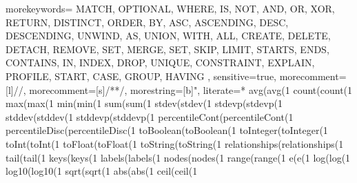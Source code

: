 \usepackage{listings}



{
	morekeywords={
		MATCH, OPTIONAL, WHERE, IS, NOT, AND, OR, XOR, RETURN, DISTINCT, ORDER, BY, ASC, ASCENDING, DESC, DESCENDING, UNWIND, AS, UNION, WITH, ALL, CREATE, DELETE, DETACH, REMOVE, SET, MERGE, SET, SKIP, LIMIT,
		STARTS, ENDS, CONTAINS,
		IN,
		INDEX, DROP, UNIQUE, CONSTRAINT, EXPLAIN, PROFILE, START, CASE,
		GROUP, HAVING
	},
	sensitive=true,
	morecomment=[l]{//},
	morecomment=[s]{/*}{*/},
	morestring=[b]{"},
	literate=*
		{avg(}{\textcolor{functioncolor}{avg}(}{1}%
		{count(}{\textcolor{functioncolor}{count}(}{1}%
		{max(}{\textcolor{functioncolor}{max}(}{1}%
		{min(}{\textcolor{functioncolor}{min}(}{1}%
		{sum(}{\textcolor{functioncolor}{sum}(}{1}%
		{stdev(}{\textcolor{functioncolor}{stdev}(}{1}%
		{stdevp(}{\textcolor{functioncolor}{stdevp}(}{1}%
		{stddev(}{\textcolor{functioncolor}{stddev}(}{1}%
		{stddevp(}{\textcolor{functioncolor}{stddevp}(}{1}%
		{percentileCont(}{\textcolor{functioncolor}{percentileCont}(}{1}%
		{percentileDisc(}{\textcolor{functioncolor}{percentileDisc}(}{1}%
		{toBoolean(}{\textcolor{functioncolor}{toBoolean}(}{1}%
		{toInteger(}{\textcolor{functioncolor}{toInteger}(}{1}%
		{toInt(}{\textcolor{functioncolor}{toInt}(}{1}%
		{toFloat(}{\textcolor{functioncolor}{toFloat}(}{1}%
		{toString(}{\textcolor{functioncolor}{toString}(}{1}%
		{relationships(}{\textcolor{functioncolor}{relationships}(}{1}%
		{tail(}{\textcolor{functioncolor}{tail}(}{1}%
		{keys(}{\textcolor{functioncolor}{keys}(}{1}%
		{labels(}{\textcolor{functioncolor}{labels}(}{1}%
		{nodes(}{\textcolor{functioncolor}{nodes}(}{1}%
		{range(}{\textcolor{functioncolor}{range}(}{1}%
		{e(}{\textcolor{functioncolor}{e}(}{1}%
		{log(}{\textcolor{functioncolor}{log}(}{1}%
		{log10(}{\textcolor{functioncolor}{log10}(}{1}%
		{sqrt(}{\textcolor{functioncolor}{sqrt}(}{1}%
		{abs(}{\textcolor{functioncolor}{abs}(}{1}%
		{ceil(}{\textcolor{functioncolor}{ceil}(}{1}%
}
